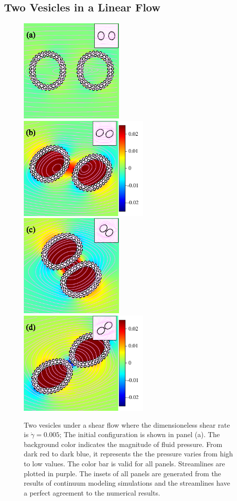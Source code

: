 \documentclass[lineno]{jfm}
\begin{document}
%


\subsection{Two Vesicles in a Linear Flow}


\begin{figure}
\centering
\includegraphics[height=2in]{N116_shear_0.pdf}
\includegraphics[height=2in]{N116_shear_2500.pdf}\\
\includegraphics[height=2in]{N116_shear_5000.pdf}
\includegraphics[height=2in]{N116_shear_7500.pdf}
  \caption{Two vesicles under a shear flow where the dimensioneless shear rate is $\dot\gamma=0.005$; The initial configuration is shown in panel (a). The background color indicates the magnitude of fluid pressure. From dark red to dark blue, it represents the the pressure varies from high to low values. The color bar is valid for all panels. Streamlines are plotted in purple. The insets of all panels are generated from the results of continuum modeling simulations and the streamlines have a perfect agreement to the numerical results.
  }
    \label{figure9}
\end{figure}
\end{document}
